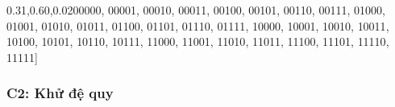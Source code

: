 \documentclass[
]{article}
\newenvironment{Shaded}{\begin{snugshade}}{\end{snugshade}}
\newcommand{\NormalTok}[1]{#1}
\newcommand{\StringTok}[1]{\textcolor[rgb]{0.31,0.60,0.02}{#1}}
\begin{document}
\begin{Shaded}
\begin{Highlighting}[]
\NormalTok{[}\StringTok{\textquotesingle{}00000\textquotesingle{}}\NormalTok{, }\StringTok{\textquotesingle{}00001\textquotesingle{}}\NormalTok{, }\StringTok{\textquotesingle{}00010\textquotesingle{}}\NormalTok{, }\StringTok{\textquotesingle{}00011\textquotesingle{}}\NormalTok{, }\StringTok{\textquotesingle{}00100\textquotesingle{}}\NormalTok{, }\StringTok{\textquotesingle{}00101\textquotesingle{}}\NormalTok{, }\StringTok{\textquotesingle{}00110\textquotesingle{}}\NormalTok{, }\StringTok{\textquotesingle{}00111\textquotesingle{}}\NormalTok{, }\StringTok{\textquotesingle{}01000\textquotesingle{}}\NormalTok{, }\StringTok{\textquotesingle{}01001\textquotesingle{}}\NormalTok{, }\StringTok{\textquotesingle{}01010\textquotesingle{}}\NormalTok{, }\StringTok{\textquotesingle{}01011\textquotesingle{}}\NormalTok{, }\StringTok{\textquotesingle{}01100\textquotesingle{}}\NormalTok{, }\StringTok{\textquotesingle{}01101\textquotesingle{}}\NormalTok{, }\StringTok{\textquotesingle{}01110\textquotesingle{}}\NormalTok{, }\StringTok{\textquotesingle{}01111\textquotesingle{}}\NormalTok{, }\StringTok{\textquotesingle{}10000\textquotesingle{}}\NormalTok{, }\StringTok{\textquotesingle{}10001\textquotesingle{}}\NormalTok{, }\StringTok{\textquotesingle{}10010\textquotesingle{}}\NormalTok{, }\StringTok{\textquotesingle{}10011\textquotesingle{}}\NormalTok{, }\StringTok{\textquotesingle{}10100\textquotesingle{}}\NormalTok{, }\StringTok{\textquotesingle{}10101\textquotesingle{}}\NormalTok{, }\StringTok{\textquotesingle{}10110\textquotesingle{}}\NormalTok{, }\StringTok{\textquotesingle{}10111\textquotesingle{}}\NormalTok{, }\StringTok{\textquotesingle{}11000\textquotesingle{}}\NormalTok{, }\StringTok{\textquotesingle{}11001\textquotesingle{}}\NormalTok{, }\StringTok{\textquotesingle{}11010\textquotesingle{}}\NormalTok{, }\StringTok{\textquotesingle{}11011\textquotesingle{}}\NormalTok{, }\StringTok{\textquotesingle{}11100\textquotesingle{}}\NormalTok{, }\StringTok{\textquotesingle{}11101\textquotesingle{}}\NormalTok{, }\StringTok{\textquotesingle{}11110\textquotesingle{}}\NormalTok{, }\StringTok{\textquotesingle{}11111\textquotesingle{}}\NormalTok{]}
\end{Highlighting}
\end{Shaded}

\hypertarget{c2-khux1eed-ux111ux1ec7-quy}{%
\subsubsection{C2: Khử đệ quy}\label{c2-khux1eed-ux111ux1ec7-quy}}
\end{document}
